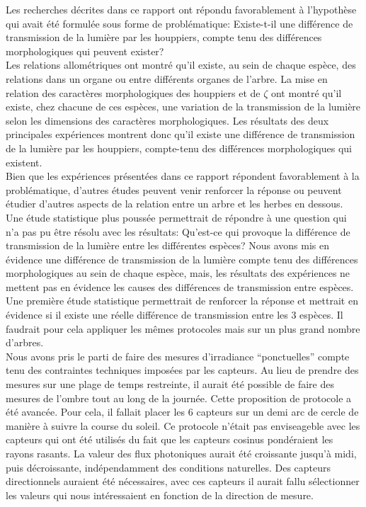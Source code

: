 ﻿\documentclass[12pt]{report}
\begin{document}
Les recherches décrites dans ce rapport ont répondu favorablement à l'hypothèse
qui avait été formulée sous forme de problématique: Existe-t-il une différence de
transmission de la lumière par les houppiers, compte tenu des différences
morphologiques qui peuvent exister?\\

Les relations allométriques ont montré qu'il existe, au sein de chaque espèce,
des relations dans un organe ou entre différents organes de l'arbre. La
mise en relation des caractères morphologiques des houppiers et de $\zeta$
ont montré qu'il existe, chez chacune de ces espèces, une variation de la
transmission de la lumière selon les dimensions des caractères morphologiques.
Les résultats des deux principales expériences montrent donc qu'il existe une
différence de transmission de la lumière par les houppiers, compte-tenu des
différences morphologiques qui existent.\\

Bien que les expériences présentées dans ce rapport répondent favorablement à
la problématique, d'autres études peuvent venir renforcer la réponse ou peuvent
étudier d'autres aspects de la relation entre un arbre et les herbes en dessous.
Une étude statistique plus poussée permettrait de répondre à une question qui
n'a pas pu être résolu avec les résultats: Qu'est-ce qui provoque la différence
de transmission de la lumière entre les différentes espèces? Nous avons mis en
évidence une différence de transmission de la lumière compte tenu des
différences morphologiques au sein de chaque espèce, mais, les résultats des
expériences ne mettent pas en évidence les causes des différences de
transmission entre espèces. Une première étude statistique permettrait de
renforcer la réponse et mettrait en évidence si il existe une réelle différence
de transmission entre les 3 espèces. Il faudrait pour cela appliquer les mêmes
protocoles mais sur un plus grand nombre d'arbres.\\

Nous avons pris le parti de faire des mesures d'irradiance ``ponctuelles''
compte tenu des contraintes techniques imposées par les capteurs. Au lieu de
prendre des mesures sur une plage de temps restreinte, il aurait été possible de
faire des mesures de l'ombre tout au long de la journée. Cette proposition
de protocole a été avancée. Pour cela, il fallait placer les 6 capteurs sur un
demi arc de cercle de manière à suivre la course du soleil. Ce protocole n'était
pas enviseageble avec les capteurs qui ont été utilisés du fait que les capteurs
cosinus pondéraient les rayons rasants. La valeur des flux photoniques aurait
été croissante jusqu'à midi, puis décroissante, indépendamment des conditions
naturelles. Des capteurs directionnels auraient été nécessaires, avec ces
capteurs il aurait fallu sélectionner les valeurs qui nous intéressaient en
fonction de la direction de mesure.
\end{document}
